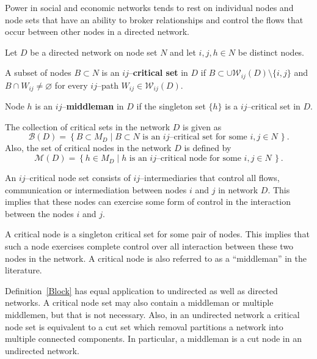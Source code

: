 Power in social and economic networks tends to rest on individual nodes and node sets that have an ability to broker relationships and control the flows that occur between other nodes in a directed network.
\begin{definition} \label{Block}
Let $D$ be a directed network on node set $N$ and let $i,j,h \in N$ be distinct nodes.
\begin{abet}

\item A subset of nodes $B \subset N$ is an $ij$--\textbf{critical set} in $D$ if $B \subset \cup \mathcal{W}_{ij}(D) \setminus \{i,j\}$ and $B \cap W_{ij} \neq \varnothing$ for every $ij$--path $W_{ij} \in \mathcal{W}_{ij}(D)$.

\item Node $h$ is an $ij$--\textbf{middleman} in $D$ if the singleton set $\{ h \}$ is a $ij$--critical set in $D$.

\item The collection of critical sets in the network $D$ is given as
\begin{equation}
\mathcal{B}(D) = \left\{ B \subset M_D \mid B \subset N \mbox{ is an $ij$--critical set for some } i,j \in N \, \right\} .
\end{equation}
Also, the set of critical nodes in the network $D$ is defined by
\begin{equation}
\mathcal{M}(D) = \left\{ h \in M_D \mid h \mbox{ is an $ij$--critical node for some } i,j \in N \, \right\} .
\end{equation}

\end{abet}
\end{definition}
An $ij$--critical node set consists of $ij$--intermediaries that control all flows, communication or intermediation between nodes $i$ and $j$ in network $D$. This implies that these nodes can exercise some form of control in the interaction between the nodes $i$ and $j$.

A critical node is a singleton critical set for some pair of nodes. This implies that such a node exercises complete control over all interaction between these two nodes in the network. A critical node is also referred to as a ``middleman'' in the literature.

Definition~\ref{Block} has equal application to undirected as well as directed networks. A critical node set may also contain a middleman or multiple middlemen, but that is not necessary. Also, in an undirected network a critical node set is equivalent to a cut set which removal partitions a network into multiple connected components. In particular, a middleman is a cut node in an undirected network.


